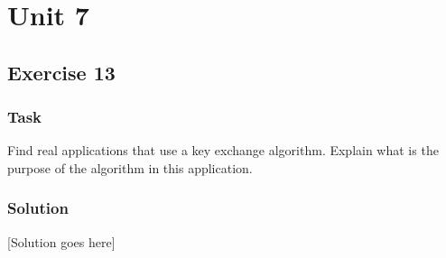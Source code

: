 \chapter{Unit 7}
\section{Exercise 13}

\subsection{Task}
Find real applications that use a key exchange algorithm. Explain
what is the purpose of the algorithm in this application.

\subsection{Solution}
[Solution goes here] 